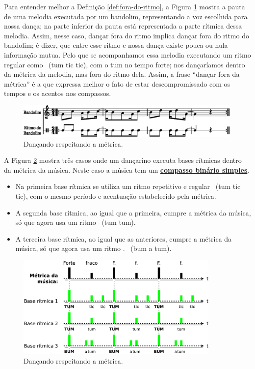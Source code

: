 Para entender melhor a Definição \ref{def:fora-do-ritmo}, a 
Figura \ref{fig:fora-do-ritmo-0-1} mostra a pauta de uma melodia executada por um bandolim, 
representando a voz escolhida para nossa dança; 
na parte inferior da pauta está representada a parte rítmica dessa melodia.
Assim, nesse caso, dançar fora do ritmo implica dançar fora do ritmo do bandolim;
é dizer, que entre esse ritmo e nossa dança existe pouca ou nula informação mutua.
Pelo que se acompanhamos essa melodia executando um ritmo regular como 
\Vier \Acht \Acht~(tum tic tic), com o tum no tempo forte;
nos dançaríamos dentro da métrica da melodia,
mas fora do ritmo dela. 
Assim, a frase ``dançar fora da métrica'' é a que expressa melhor o fato de estar descompromissado com os tempos
e os acentos nos compassos. 
\begin{figure}[!h]
    \centering 
    \includegraphics[width=0.99\textwidth]{chapters/cap-musicalidade/fora-do-ritmo-0-1.eps}
    \caption{Dançando respeitando a métrica.}
    \label{fig:fora-do-ritmo-0-1}
\end{figure}

\begin{example}
A Figura \ref{fig:fora-do-ritmo-com} mostra três casos onde um dançarino
executa bases rítmicas dentro da métrica da música. 
Neste caso a música  tem um \hyperref[subsec:compassobinario]{\textbf{compasso binário simples}}.
\begin{itemize}
\item Na primeira base rítmica se utiliza um ritmo repetitivo e regular \Vier \Acht \Acht~(tum tic tic),
com o mesmo período e acentuação estabelecido pela métrica. 
\item A segunda base rítmica, ao igual que a primeira, cumpre a métrica da música,
só que agora usa um ritmo \Vier \Vier~(tum tum).
\item A terceira base rítmica, ao igual que as anteriores, cumpre a métrica da música,
só que agora usa um ritmo \Acht. \Sech \Vier~(bum a tum).
\end{itemize}
\end{example}

\begin{figure}[!h]
    \centering 
    \includegraphics[width=0.89\textwidth]{chapters/cap-musicalidade/fora-do-ritmo-com.eps}
    \caption{Dançando respeitando a métrica.}
    \label{fig:fora-do-ritmo-com}
\end{figure}

